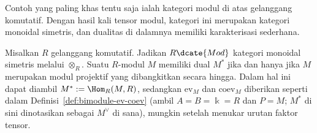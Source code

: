 Contoh yang paling khas tentu saja ialah kategori modul di atas gelanggang
komutatif. Dengan hasil kali tensor modul, kategori ini merupakan kategori
monoidal simetris, dan dualitas di dalamnya memiliki karakterisasi sederhana.

\begin{proposition}\label{prop:dualizable-module}
	Misalkan $R$ gelanggang komutatif. Jadikan $R\dcate{Mod}$ kategori
	monoidal simetris melalui $\otimes_R$. Suatu $R$-modul $M$ memiliki
	dual $M^*$ jika dan hanya jika $M$ merupakan modul projektif yang
	dibangkitkan secara hingga. Dalam hal ini dapat diambil
	$M^*:=\Hom_R(M,R)$, sedangkan $\mathrm{ev}_M$ dan $\mathrm{coev}_M$
	diberikan seperti dalam Definisi~\ref{def:bimodule-ev-coev} (ambil
	$A=B=\Bbbk=R$ dan $P=M$; $M^*$ di sini dinotasikan sebagai $M^\vee$
	di sana), mungkin setelah menukar urutan faktor tensor.
\end{proposition}
